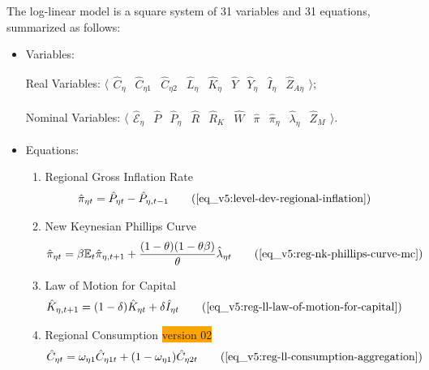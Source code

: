 \documentclass[../thesis.tex]{subfiles}
\begin{document}
The log-linear model is a square system of 31 variables and 31 equations, summarized as follows:

{\singlespacing

\begin{itemize}
	
	\item Variables:
	
	Real Variables: $\langle \begin{smallmatrix} \hat{C}_{\eta} & \hat{C}_{\eta 1} & \hat{C}_{\eta 2} & \hat{L}_{\eta} & \hat{K}_{\eta} & \hat{Y} & \hat{Y}_{\eta} & \hat{I}_{\eta} & \hat{Z}_{A\eta} \end{smallmatrix} \rangle$;
	
	Nominal Variables: $\langle \begin{smallmatrix} \hat{\mathscr{E}}_{\eta} & \hat{P} & \hat{P}_{\eta} & \hat{R} & \hat{R}_{K} & \hat{W} & \hat{\pi} & \hat{\pi}_{\eta} & \hat{\lambda}_{\eta} & \hat{Z}_M \end{smallmatrix} \rangle$.
	
	\item Equations:
	
	\begin{enumerate}
		
		\item Regional Gross Inflation Rate
		\begin{align}
			\hat{\pi}_{\eta t} &= \hat{P}_{\eta t} - \hat{P}_{\eta, t-1} \tag{\ref{eq_v5:level-dev-regional-inflation}}
		\end{align}
		
		\item New Keynesian Phillips Curve
		\begin{align}
			\hat{\pi}_{\eta t} &= \beta \E \hat{\pi}_{\eta, t+1} + \frac{(1-\theta) (1- \theta \beta)}{\theta} \hat{\lambda}_{\eta t} \tag{\ref{eq_v5:reg-nk-phillips-curve-mc}}
		\end{align}
		
		\item Law of Motion for Capital
		\begin{alignat}{2}
			\hat{K}_{\eta, t+1} &= (1-\delta) \hat{K}_{\eta t} + \delta \hat{I}_{\eta t} \tag{\ref{eq_v5:reg-ll-law-of-motion-for-capital}}
		\end{alignat}
		

\item Regional Consumption \colorbox{orange}{version 02}
\begin{align}
	\hat{C}_{\eta t} &= \omega_{\eta 1} \hat{C}_{\eta 1 t} + (1-\omega_{\eta 1}) \hat{C}_{\eta 2 t} \tag{\ref{eq_v5:reg-ll-consumption-aggregation}}
\end{align}


\end{enumerate}
\end{itemize}}
\end{document}
